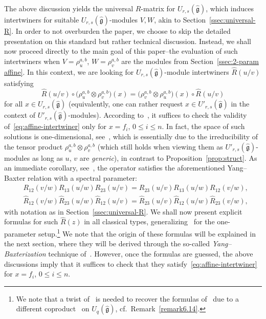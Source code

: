 \documentclass[pdftex]{sigma}
\numberwithin{equation}{section}
\newcommand{\fg}{\mathfrak{g}}
\newcommand{\UU}{U_{r,s}(\widehat{\fg})}
\newcommand{\Uu}{U'_{r,s}(\widehat{\fg})}
\newcommand\iso{ \vphantom{j^{X^2}}\smash{\overset{\sim}{\vphantom{\rule{0pt}{0.20em}}\smash{\longrightarrow}}} }
\begin{document}
The above discussion yields the universal $R$-matrix for $\UU$, which induces intertwiners \smash{$V\otimes W\iso W\otimes V$} for suitable $\UU$-modules $V,W$, akin to Section~\ref{ssec:universal-R}. In order to not overburden the paper, we choose to skip the detailed presentation on this standard but rather technical discussion. Instead, we shall now proceed directly to the main goal of this paper--the evaluation of such intertwiners when $V=\rho^{a,b}_u$, $W=\rho^{a,b}_v$ are the modules from Section~\ref{ssec:2-param affine}. In this context, we are looking for $\UU$-module intertwiners $\hat{R}(u/v)$ satisfying
\begin{equation}\label{eq:affine-intertwiner}
 \hat{R}(u/v)\circ \bigl(\rho^{a,b}_u\otimes \rho^{a,b}_v\bigr)(x) =
 \bigl(\rho^{a,b}_v\otimes \rho^{a,b}_u\bigr)(x)\circ \hat{R}(u/v)
\end{equation}
for all $x\in \UU$ (equivalently, one can rather request $x\in \Uu$ in the context of $\Uu$-modules). According to~\cite[Proposition~2]{Jim}, it suffices to check the validity of~\eqref{eq:affine-intertwiner} only for $x=f_i$, $0\leq i\leq n$. In fact, the space of such solutions is one-dimensional, see~\cite[Proposition~1]{Jim}, which is essentially due to the irreducibility of the tensor product $\rho^{a,b}_u\otimes \rho^{a,b}_v$ (which still holds when viewing them as $\Uu$-modules as long as $u$, $v$ are \emph{generic}), in contrast to Proposition~\ref{prop:struct}. As an immediate corollary, see~\cite[Proposition~3]{Jim}, the operator  satisfies the aforementioned Yang--Baxter relation with a spectral parameter:
\begin{align}
 & R_{12}(v/w) R_{13}(u/w) R_{23}(u/v) = R_{23}(u/v) R_{13}(u/w) R_{12}(v/w),\nonumber \\
 & \hat{R}_{12}(v/w) \hat{R}_{23}(u/w) \hat{R}_{12}(u/v) =
 \hat{R}_{23}(u/v) \hat{R}_{12}(u/w) \hat{R}_{23}(v/w),\label{eq:qYB-affine}
\end{align}
with notation as in Section~\ref{ssec:universal-R}. We shall now present explicit formulas for such $\hat{R}(z)$ in all classical types, generalizing~\cite{Jim} for the one-parameter setup.\footnote{We note that a twist of~\cite{R} is needed to recover the formulas of~\cite[Section~3]{Jim} due to a different coproduct~\cite[equation~(2.10)]{Jim} on $U_q(\widehat{\fg})$, cf.~Remark~\ref{remark6.14}.} We note that the origin of these formulas will be explained in the next section, where they will be derived through the so-called \emph{Yang--Baxterization} technique of~\cite{GWX}. However, once the formulas are guessed, the above discussions imply that it suffices to check that they satisfy~\eqref{eq:affine-intertwiner} for $x=f_i$, $0\leq i\leq n$.
\end{document}

